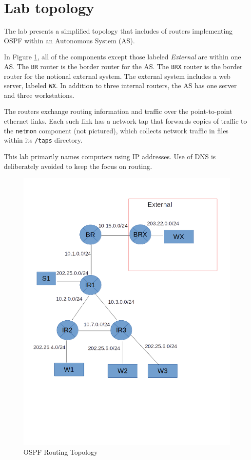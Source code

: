 \section{Lab topology}
The lab presents a simplified topology that includes of routers implementing OSPF within an Autonomous System (AS).  

In Figure \ref{fig:topology}, all of the components except those labeled \textit {External} are within one AS.
The {\tt BR} router is the border router for the AS.  The {\tt BRX} router is the border router for the 
notional external system.  The external system includes a web server, labeled {\tt WX}.
In addition to three internal routers, the AS has one server and three workstations.

The routers exchange routing information and traffic over the point-to-point ethernet
links.  Each such link has a network tap that forwards copies of traffic to the {\tt netmon} component (not pictured), 
which collects network traffic in files within its {\tt /taps} directory.

This lab primarily names computers using IP addresses.  Use of DNS is deliberately avoided to keep the focus on routing.

\begin{figure}[H]
\begin{center}
\includegraphics [width=0.8\linewidth]{topo.png}
\end{center}
\caption{OSPF Routing Topology}
\label{fig:topology}
\end{figure}

